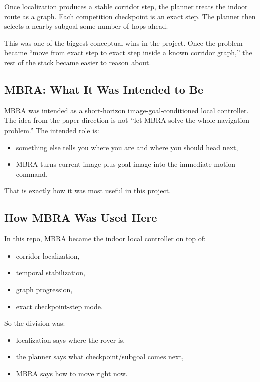 \documentclass[11pt]{article}
\begin{document}
Once localization produces a stable corridor step, the planner treats the indoor
route as a graph. Each competition checkpoint is an exact step. The planner then
selects a nearby subgoal some number of hops ahead.

This was one of the biggest conceptual wins in the project. Once the problem became
``move from exact step to exact step inside a known corridor graph,'' the rest of
the stack became easier to reason about.

\subsection{MBRA: What It Was Intended to Be}

MBRA was intended as a short-horizon image-goal-conditioned local controller. The
idea from the paper direction is not ``let MBRA solve the whole navigation
problem.'' The intended role is:

\begin{itemize}[nosep]
  \item something else tells you where you are and where you should head next,
  \item MBRA turns current image plus goal image into the immediate motion command.
\end{itemize}

That is exactly how it was most useful in this project.

\subsection{How MBRA Was Used Here}

In this repo, MBRA became the indoor local controller on top of:

\begin{itemize}[nosep]
  \item corridor localization,
  \item temporal stabilization,
  \item graph progression,
  \item exact checkpoint-step mode.
\end{itemize}

So the division was:

\begin{itemize}[nosep]
  \item localization says where the rover is,
  \item the planner says what checkpoint/subgoal comes next,
  \item MBRA says how to move right now.
\end{itemize}
\end{document}

